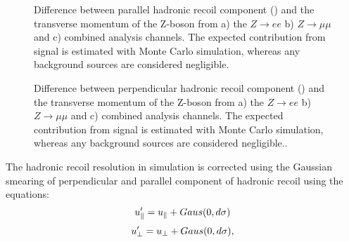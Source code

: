\begin{figure}[!tbp]
\begin{minipage}[h]{0.32\linewidth}
\end{minipage}
\hfill
\begin{minipage}[h]{0.32\linewidth}
\end{minipage}
\hfill
\begin{minipage}[h]{0.32\linewidth}
\end{minipage}
\caption{Difference between parallel hadronic recoil component (\upar) and the transverse momentum of the Z-boson from a) the $Z\to ee$  b) $Z\to\mu\mu$  and c) combined analysis channels. The expected contribution from signal is estimated with Monte Carlo simulation, whereas any background sources are considered negligible.}
\label{HadrRecoil:UparSmear}
\end{figure}

\begin{figure}[!tbp]
\begin{minipage}[h]{0.32\linewidth}
\end{minipage}
\hfill
\begin{minipage}[h]{0.32\linewidth}
\end{minipage}
\hfill
\begin{minipage}[h]{0.32\linewidth}
\end{minipage}
\caption{Difference between perpendicular hadronic recoil component (\uperp) and the transverse momentum of the Z-boson from a) the $Z\to ee$  b) $Z\to\mu\mu$  and c) combined analysis channels. The expected contribution from signal is estimated with Monte Carlo simulation, whereas any background sources are considered negligible..}
\label{HadrRecoil:UpeprSmear}
\end{figure}

The hadronic recoil resolution in simulation is corrected using the Gaussian smearing of perpendicular and parallel component of hadronic recoil using the equations:
\begin{equation}
u_{\parallel}' = u_{\parallel}+Gaus(0, d\sigma)
\end{equation}
\begin{equation}
u_{\perp}' = u_{\perp} + Gaus(0, d\sigma),
\end{equation}

